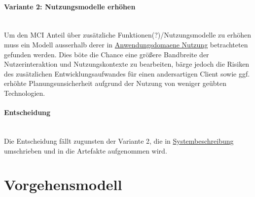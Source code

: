 %
\paragraph*{Variante 2: Nutzungsmodelle erhöhen}\\
Um den MCI Anteil über zusätzliche Funktionen(?)/Nutzungsmodelle zu erhöhen muss ein Modell ausserhalb derer in \href{}{Anwendungsdomaene Nutzung} betrachteten gefunden werden. Dies böte die Chance eine größere Bandbreite der Nutzerinteraktion und 
Nutzungskontexte zu bearbeiten, bärge jedoch die Risiken des zusätzlichen Entwicklungsaufwandes für einen andersartigen Client
sowie ggf. erhöhte Planungsunsicherheit aufgrund der Nutzung von weniger geübten Technologien.

%
\paragraph*{Entscheidung}\\
Die Entscheidung fällt zugunsten der Variante 2, die in \href{sec:systembeschreibung_steuerungsclient}{Systembeschreibung} umschrieben
und in die Artefakte aufgenommen wird.


\section{Vorgehensmodell}


